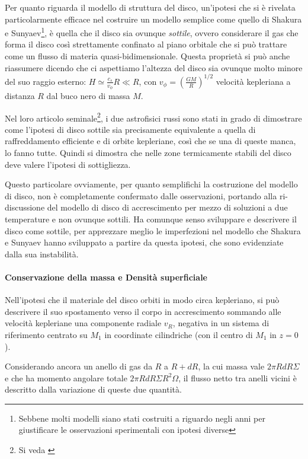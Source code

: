 \documentclass[a4paperbi]{article}
\begin{document}
	Per quanto riguarda il modello di struttura del disco, un'ipotesi che si è rivelata particolarmente efficace nel costruire un modello semplice come quello di Shakura e Sunyaev\footnote{Sebbene molti modelli siano stati costruiti a riguardo negli anni per giustificare le osservazioni sperimentali con ipotesi diverse}, è quella che il disco sia ovunque \textit{sottile}, ovvero considerare il gas che forma il disco così strettamente confinato al piano orbitale che si può trattare come un flusso di materia quasi-bidimensionale. Questa proprietà si può anche riassumere dicendo che ci aspettiamo l'altezza del disco sia ovunque molto minore del suo raggio esterno: $H\simeq\frac{c_s}{v_\phi}R\ll R$, con $v_\phi=\left(\frac{GM}{R}\right)^{1/2}$ velocità kepleriana a distanza $R$ dal buco nero di massa $M$.
	
	Nel loro articolo seminale\footnote{Si veda \cite{ShakuraSunyaev1973}}, i due astrofisici russi sono stati in grado di dimostrare come l'ipotesi di disco sottile sia precisamente equivalente a quella di raffreddamento efficiente e di orbite kepleriane, così che se una di queste manca, lo fanno tutte. Quindi si dimostra che nelle zone termicamente stabili del disco deve valere l'ipotesi di sottigliezza.
	
	Questo particolare ovviamente, per quanto semplifichi la costruzione del modello di disco, non è completamente confermato dalle osservazioni, portando alla ri-discussione del modello di disco di accrescimento per mezzo di soluzioni a due temperature e non ovunque sottili. Ha comunque senso sviluppare e descrivere il disco come sottile, per apprezzare meglio le imperfezioni nel modello che Shakura e Sunyaev hanno sviluppato a partire da questa ipotesi, che sono evidenziate dalla sua instabilità.
		
	\paragraph{Conservazione della massa e Densità superficiale}
		Nell'ipotesi che il materiale del disco orbiti in modo circa kepleriano, si può descrivere il suo spostamento verso il corpo in accrescimento sommando alle velocità kepleriane una componente radiale $v_R$, negativa in un sistema di riferimento centrato su $M_1$ in coordinate cilindriche (con il centro di $M_1$ in $z=0$).

	Considerando ancora un anello di gas da $R$ a $R+dR$, la cui massa vale $2\pi RdR\Sigma$ e che ha momento angolare totale $2\pi RdR\Sigma R^2\Omega$, il flusso netto tra anelli vicini è descritto dalla variazione di queste due quantità. 
	
\end{document}

